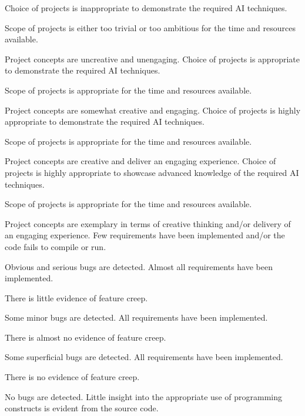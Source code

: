 \documentclass{../../fal_assignment}
\begin{document}
\rubricmasters
\rubrichead{\ }
\begin{markingrubric}
%
        \grade\fail Choice of projects is inappropriate to demonstrate the required AI techniques.
            \par Scope of projects is either too trivial or too ambitious for the time and resources available.
            \par Project concepts are uncreative and unengaging.
        \grade Choice of projects is appropriate to demonstrate the required AI techniques.
            \par Scope of projects is appropriate for the time and resources available.
            \par Project concepts are somewhat creative and engaging.
        \grade Choice of projects is highly appropriate to demonstrate the required AI techniques.
            \par Scope of projects is appropriate for the time and resources available.
            \par Project concepts are creative and deliver an engaging experience.
        \grade Choice of projects is highly appropriate to showcase advanced knowledge of the required AI techniques.
            \par Scope of projects is appropriate for the time and resources available.
            \par Project concepts are exemplary in terms of creative thinking and/or delivery of an engaging experience.
%
        \grade \fail Few requirements have been implemented  and/or the code fails to compile or run.
            \par Obvious and serious bugs are detected.
        \grade Almost all requirements have been implemented.
            \par There is little evidence of feature creep.
            \par Some minor bugs  are detected.
        \grade All requirements have been implemented.
            \par There is almost no evidence of feature creep.
            \par Some superficial bugs are detected.
        \grade All requirements have been implemented.
            \par There is no evidence of feature creep.
            \par No bugs are detected.
%
        \grade \fail Little insight into the appropriate use of programming constructs is evident from the source code.

\end{markingrubric}
\end{document}

